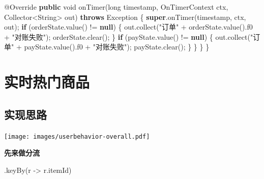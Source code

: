 \documentclass[cn,11pt,chinese]{elegantbook}
\newenvironment{Shaded}{}{}
\newcommand{\AttributeTok}[1]{\textcolor[rgb]{0.49,0.56,0.16}{#1}}
\newcommand{\BuiltInTok}[1]{#1}
\newcommand{\DataTypeTok}[1]{\textcolor[rgb]{0.56,0.13,0.00}{#1}}
\newcommand{\FunctionTok}[1]{\textcolor[rgb]{0.02,0.16,0.49}{#1}}
\newcommand{\KeywordTok}[1]{\textcolor[rgb]{0.00,0.44,0.13}{\textbf{#1}}}
\newcommand{\NormalTok}[1]{#1}
\newcommand{\StringTok}[1]{\textcolor[rgb]{0.25,0.44,0.63}{#1}}
\begin{document}
\begin{Shaded}
\begin{Highlighting}[]
        \AttributeTok{@Override}
        \KeywordTok{public} \DataTypeTok{void} \FunctionTok{onTimer}\NormalTok{(}\DataTypeTok{long}\NormalTok{ timestamp, OnTimerContext ctx, Collector\textless{}}\BuiltInTok{String}\NormalTok{\textgreater{} out) }\KeywordTok{throws} \BuiltInTok{Exception}\NormalTok{ \{}
            \KeywordTok{super}\NormalTok{.}\FunctionTok{onTimer}\NormalTok{(timestamp, ctx, out);}
            \KeywordTok{if}\NormalTok{ (orderState.}\FunctionTok{value}\NormalTok{() != }\KeywordTok{null}\NormalTok{) \{}
\NormalTok{                out.}\FunctionTok{collect}\NormalTok{(}\StringTok{"订单"}\NormalTok{ + orderState.}\FunctionTok{value}\NormalTok{().}\FunctionTok{f0}\NormalTok{ + }\StringTok{"对账失败"}\NormalTok{);}
\NormalTok{                orderState.}\FunctionTok{clear}\NormalTok{();}
\NormalTok{            \}}
            \KeywordTok{if}\NormalTok{ (payState.}\FunctionTok{value}\NormalTok{() != }\KeywordTok{null}\NormalTok{) \{}
\NormalTok{                out.}\FunctionTok{collect}\NormalTok{(}\StringTok{"订单"}\NormalTok{ + payState.}\FunctionTok{value}\NormalTok{().}\FunctionTok{f0}\NormalTok{ + }\StringTok{"对账失败"}\NormalTok{);}
\NormalTok{                payState.}\FunctionTok{clear}\NormalTok{();}
\NormalTok{            \}}
\NormalTok{        \}}
\NormalTok{    \}}
\NormalTok{\}}
\end{Highlighting}
\end{Shaded}

\hypertarget{ux5b9eux65f6ux70edux95e8ux5546ux54c1}{%
\section{实时热门商品}\label{ux5b9eux65f6ux70edux95e8ux5546ux54c1}}

\hypertarget{ux5b9eux73b0ux601dux8def}{%
\subsection{实现思路}\label{ux5b9eux73b0ux601dux8def}}

\texttt{[image: images/userbehavior-overall.pdf]}

\textbf{先来做分流}

\begin{Shaded}
\begin{Highlighting}[]
\NormalTok{.}\FunctionTok{keyBy}\NormalTok{(r {-}\textgreater{} r.}\FunctionTok{itemId}\NormalTok{)}
\end{Highlighting}
\end{Shaded}
\end{document}

